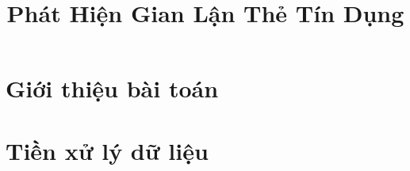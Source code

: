\documentclass[twoside,final]{hcmut-report}
\title{\Large{Phát Hiện Gian Lận Thẻ Tín Dụng}}
\begin{document}
\coverpage%


\tableofcontents
\listoffigures
\listoftables
\lstlistoflistings{}

\clearpage

\section{Giới thiệu bài toán}\label{sec:gioi-thieu}


\clearpage
\section{Tiền xử lý dữ liệu}\label{sec:tien-xu-ly}



\clearpage
\end{document}
